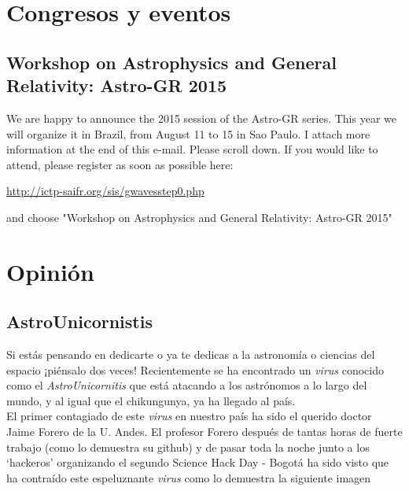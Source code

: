 \documentclass{book}
\begin{document}
\section*{Congresos y eventos}

\subsection{Workshop on Astrophysics and General Relativity: Astro-GR 2015}
We are happy to announce the 2015 session of the Astro-GR series.
This year we will organize it in Brazil, from August 11 to 15 in Sao Paulo.
I attach more information at the end of this e-mail. Please scroll down.
If you would like to attend, please register as soon as possible here:
\begin{center}
\url{http://ictp-saifr.org/sis/gwavesstep0.php}
\end{center}
and choose "Workshop on Astrophysics and General Relativity: Astro-GR 2015"


\section*{Opinión}
\subsection{AstroUnicornistis}
Si estás pensando en dedicarte o ya te dedicas a la astronomía o ciencias del espacio ¡piénsalo dos veces! Recientemente se ha encontrado un \textit{virus} conocido como el \textit{AstroUnicornitis} que está atacando a los astrónomos a lo largo del mundo, y al igual que el chikungunya, ya ha llegado al país.\\   

El primer contagiado de este \textit{virus} en nuestro país ha sido el querido doctor Jaime Forero de la U. Andes. El profesor Forero después de tantas horas de fuerte trabajo (como lo demuestra su github) y de pasar toda la noche junto a los `hackeros' organizando el segundo Science Hack Day - Bogotá ha sido visto que ha contraído este espeluznante \textit{virus} como lo demuestra la siguiente imagen 
\end{document}

